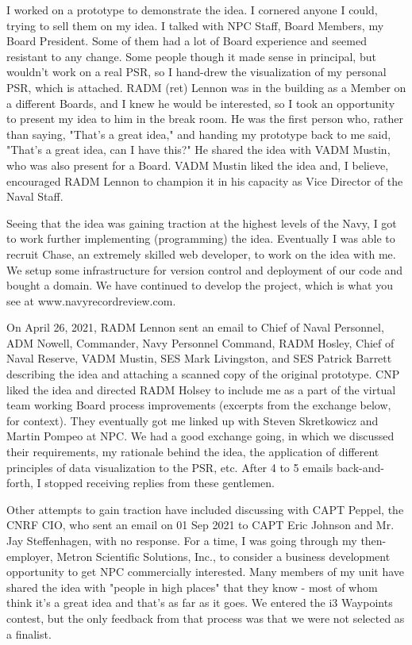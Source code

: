 \documentclass[UTF8]{article}
\begin{document}
I worked on a prototype to demonstrate the idea. I cornered anyone I could, trying to sell them on my idea. I talked with NPC Staff, Board Members, my Board President. Some of them had a lot of Board experience and seemed resistant to any change. Some people though it made sense in principal, but wouldn't work on a real PSR, so I hand-drew the visualization of my personal PSR, which is attached. RADM (ret) Lennon was in the building as a Member on a different Boards, and I knew he would be interested, so I took an opportunity to present my idea to him in the break room. He was the first person who, rather than saying, "That's a great idea," and handing my prototype back to me said, "That's a great idea, can I have this?" He shared the idea with VADM Mustin, who was also present for a Board. VADM Mustin liked the idea and, I believe, encouraged RADM Lennon to champion it in his capacity as Vice Director of the Naval Staff.

Seeing that the idea was gaining traction at the highest levels of the Navy, I got to work further implementing (programming) the idea. Eventually I was able to recruit Chase, an extremely skilled web developer, to work on the idea with me. We setup some infrastructure for version control and deployment of our code and bought a domain. We have continued to develop the project, which is what you see at www.navyrecordreview.com.

On April 26, 2021, RADM Lennon sent an email to Chief of Naval Personnel, ADM Nowell, Commander, Navy Personnel Command, RADM Hosley, Chief of Naval Reserve, VADM Mustin, SES Mark Livingston, and SES Patrick Barrett describing the idea and attaching a scanned copy of the original prototype. CNP liked the idea and directed RADM Holsey to include me as a part of the virtual team working Board process improvements (excerpts from the exchange below, for context). They eventually got me linked up with Steven Skretkowicz and Martin Pompeo at NPC. We had a good exchange going, in which we discussed their requirements, my rationale behind the idea, the application of different principles of data visualization to the PSR, etc. After 4 to 5 emails back-and-forth, I stopped receiving replies from these gentlemen.

Other attempts to gain traction have included discussing with CAPT Peppel, the CNRF CIO, who sent an email on 01 Sep 2021 to CAPT Eric Johnson and Mr. Jay Steffenhagen, with no response. For a time, I was going through my then-employer, Metron Scientific Solutions, Inc., to consider a business development opportunity to get NPC commercially interested. Many members of my unit have shared the idea with "people in high places" that they know - most of whom think it's a great idea and that's as far as it goes. We entered the i3 Waypoints contest, but the only feedback from that process was that we were not selected as a finalist.
\end{document}
